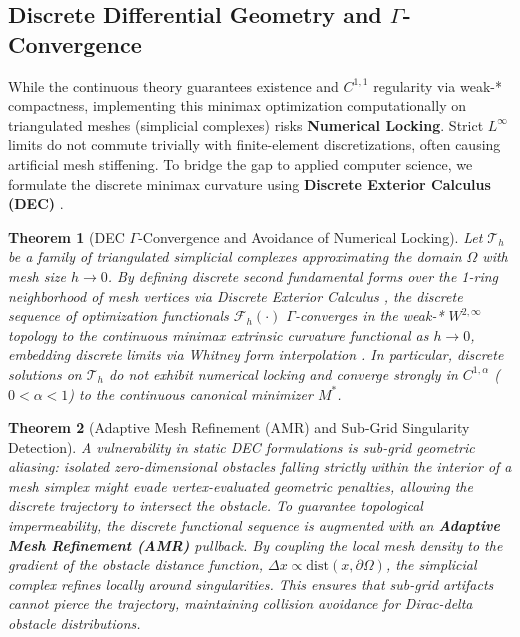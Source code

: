 \documentclass[11pt,reqno]{amsart}
\newtheorem{theorem}{Theorem}[section]
\theoremstyle{definition}
\newcommand{\dist}{\mathrm{dist}}
\numberwithin{equation}{section}
\begin{document}
\subsection{Discrete Differential Geometry and \texorpdfstring{$\Gamma$}{Gamma}-Convergence}
While the continuous theory guarantees existence and $C^{1,1}$ regularity via weak-* compactness, implementing this minimax optimization computationally on triangulated meshes (simplicial complexes) risks \textbf{Numerical Locking}. Strict $L^\infty$ limits do not commute trivially with finite-element discretizations, often causing artificial mesh stiffening. 
To bridge the gap to applied computer science, we formulate the discrete minimax curvature using \textbf{Discrete Exterior Calculus (DEC)} \cite{hirani2003, crane2013}.

\begin{theorem}[DEC $\Gamma$-Convergence and Avoidance of Numerical Locking]
\label{thm:dec_gamma_convergence}
Let $\mathcal{T}_h$ be a family of triangulated simplicial complexes approximating the domain $\Omega$ with mesh size $h \to 0$. By defining discrete second fundamental forms over the 1-ring neighborhood of mesh vertices via Discrete Exterior Calculus \cite{hirani2003, crane2013}, the discrete sequence of optimization functionals $\mathcal{F}_h(\cdot)$ $\Gamma$-converges in the weak-* $W^{2,\infty}$ topology to the continuous minimax extrinsic curvature functional as $h \to 0$, embedding discrete limits via Whitney form interpolation \cite{wardetzky2007}. In particular, discrete solutions on $\mathcal{T}_h$ do not exhibit numerical locking and converge strongly in $C^{1,\alpha}$ ($0 < \alpha < 1$) to the continuous canonical minimizer $M^*$.
\end{theorem}

\begin{theorem}[Adaptive Mesh Refinement (AMR) and Sub-Grid Singularity Detection]
\label{thm:amr_singularity}
A vulnerability in static DEC formulations is sub-grid geometric aliasing: isolated zero-dimensional obstacles falling strictly within the interior of a mesh simplex might evade vertex-evaluated geometric penalties, allowing the discrete trajectory to intersect the obstacle. To guarantee topological impermeability, the discrete functional sequence is augmented with an \textbf{Adaptive Mesh Refinement (AMR)} pullback. By coupling the local mesh density to the gradient of the obstacle distance function, $\Delta x \propto \dist(x, \partial\Omega)$, the simplicial complex refines locally around singularities. This ensures that sub-grid artifacts cannot pierce the trajectory, maintaining collision avoidance for Dirac-delta obstacle distributions.
\end{theorem}
\end{document}
